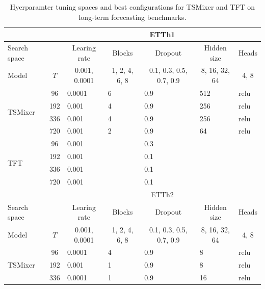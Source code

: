 \begin{longtable}{l|c|lllll}
\caption{Hyerparamter tuning spaces and best configurations for TSMixer and TFT on long-term forecasting benchmarks.} \\
\hline
 & \multicolumn{1}{l|}{} & \multicolumn{5}{c}{ETTh1} \\ \hline
\endfirsthead

\endhead

\hline
\endfoot

\endlastfoot

Search space & \multicolumn{1}{l|}{} & \multicolumn{1}{c}{Learing rate} & \multicolumn{1}{c}{Blocks} & \multicolumn{1}{c}{Dropout} & \multicolumn{1}{c}{Hidden size} & \multicolumn{1}{c}{Heads} \\ \hline
Model & $T$ & \multicolumn{1}{c}{0.001, 0.0001} & \multicolumn{1}{c}{1, 2, 4, 6, 8} & \multicolumn{1}{c}{0.1, 0.3, 0.5, 0.7, 0.9} & \multicolumn{1}{c}{8, 16, 32, 64} & \multicolumn{1}{c}{4, 8} \\ \hline
\multirow{4}{*}{TSMixer} & 96 & 0.0001 & 6 & 0.9 & 512 & relu \\
 & 192 & 0.001 & 4 & 0.9 & 256 & relu \\
 & 336 & 0.001 & 4 & 0.9 & 256 & relu \\
 & 720 & 0.001 & 2 & 0.9 & 64 & relu \\ \hline
\multirow{4}{*}{TFT} & 96 & 0.001 &  & 0.3 &  &  \\
 & 192 & 0.001 &  & 0.1 &  &  \\
 & 336 & 0.001 &  & 0.1 &  &  \\
 & 720 & 0.001 &  & 0.1 &  &  \\ \hline
 & \multicolumn{1}{l|}{} & \multicolumn{5}{c}{ETTh2} \\ \hline
Search space & \multicolumn{1}{l|}{} & \multicolumn{1}{c}{Learing rate} & \multicolumn{1}{c}{Blocks} & \multicolumn{1}{c}{Dropout} & \multicolumn{1}{c}{Hidden size} & \multicolumn{1}{c}{Heads} \\ \hline
Model & $T$ & \multicolumn{1}{c}{0.001, 0.0001} & \multicolumn{1}{c}{1, 2, 4, 6, 8} & \multicolumn{1}{c}{0.1, 0.3, 0.5, 0.7, 0.9} & \multicolumn{1}{c}{8, 16, 32, 64} & \multicolumn{1}{c}{4, 8} \\ \hline
\multirow{4}{*}{TSMixer} & 96 & 0.0001 & 4 & 0.9 & 8 & relu \\
 & 192 & 0.001 & 1 & 0.9 & 8 & relu \\
 & 336 & 0.0001 & 1 & 0.9 & 16 & relu \\

\end{longtable}
